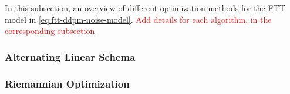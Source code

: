 \documentclass[11pt]{article}
\begin{document}
    In this subsection, an overview of different optimization methods for the FTT model in \eqref{eq:ftt-ddpm-noise-model}.
    \textcolor{red}{Add details for each algorithm, in the corresponding subsection}

    \subsubsection{Alternating Linear Schema}

    \subsubsection{Riemannian Optimization}
\end{document}
